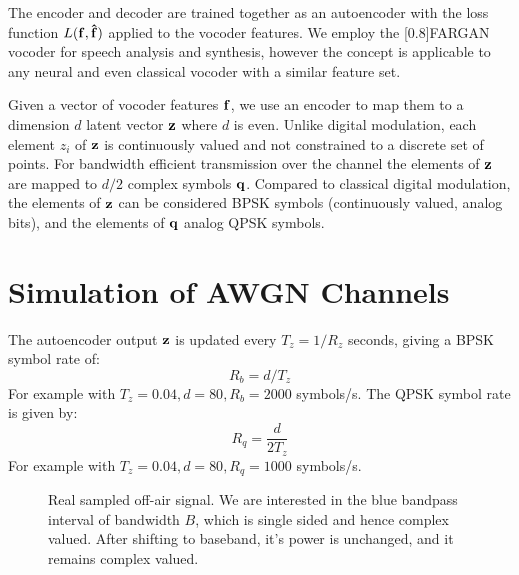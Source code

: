 \documentclass{article}
\begin{document}
The encoder and decoder are trained together as an autoencoder with the loss function  $L(\bf{f},\hat{\bf{f}})$ applied to the vocoder features.  We employ the \scalebox{0.8}[0.8]{FARGAN} vocoder \cite{valin2024low} for speech analysis and synthesis, however the concept is applicable to any neural and even classical vocoder with a similar feature set.

Given a vector of vocoder features $\bf{f}$, we use an encoder to map them to a dimension $d$ latent vector $\bf{z}$ where $d$ is even.  Unlike digital modulation, each element $z_i$ of $\bf{z}$ is continuously valued and not constrained to a discrete set of points.  For bandwidth efficient transmission over the channel the elements of $\bf{z}$ are mapped to $d/2$ complex symbols $\bf{q}$. Compared to classical digital modulation, the elements of $\bf{z}$ can be considered BPSK symbols (continuously valued, analog bits), and the elements of $\bf{q}$ analog QPSK symbols.

\section{Simulation of AWGN Channels}

The autoencoder output $\bf{z}$ is updated every $T_z=1/R_z$ seconds, giving a BPSK symbol rate of:
\begin{equation}
R_b=d/T_z
\end{equation}
For example with $T_z=0.04, d=80, R_b=2000$ symbols/s.  The QPSK symbol rate is given by:
\begin{equation}
R_q = \frac{d}{2T_z} 
\end{equation}
For example with $T_z=0.04, d=80, R_q=1000$ symbols/s.

\begin{figure}[H]
\caption{Real sampled off-air signal.  We are interested in the blue bandpass interval of bandwidth $B$, which is single sided and hence complex valued. After shifting to baseband, it's power is unchanged, and it remains complex valued.}
\vspace{5mm}
\label{fig:bandpass}
\begin{center}
\end{center}
\end{figure}
\end{document}
